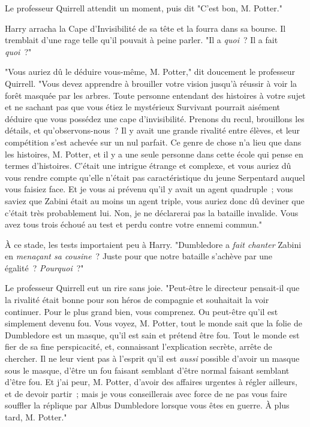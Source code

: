 \later

Le professeur Quirrell attendit un moment, puis dit "C'est bon, M. Potter."

Harry arracha la Cape d'Invisibilité de sa tête et la fourra dans sa bourse. Il tremblait d'une rage telle qu'il pouvait à peine parler. "Il a \emph{quoi}~? Il a fait \emph{quoi}~?"

"Vous auriez dû le déduire vous-même, M. Potter," dit doucement le professeur Quirrell. "Vous devez apprendre à brouiller votre vision jusqu'à réussir à voir la forêt masquée par les arbres. Toute personne entendant des histoires à votre sujet et ne sachant pas que vous étiez le mystérieux Survivant pourrait aisément déduire que vous possédez une cape d'invisibilité. Prenons du recul, brouillons les détails, et qu'observons-nous~? Il y avait une grande rivalité entre élèves, et leur compétition s'est achevée sur un nul parfait. Ce genre de chose n'a lieu que dans les histoires, M. Potter, et il y a une seule personne dans cette école qui pense en termes d'histoires. C'était une intrigue étrange et complexe, et vous auriez dû vous rendre compte qu'elle n'était pas caractéristique du jeune Serpentard auquel vous faisiez face. Et je vous ai prévenu qu'il y avait un agent quadruple~; vous saviez que Zabini était au moins un agent triple, vous auriez donc dû deviner que c'était très probablement lui. Non, je ne déclarerai pas la bataille invalide. Vous avez tous trois échoué au test et perdu contre votre ennemi commun."

À ce stade, les tests importaient peu à Harry. "Dumbledore a \emph{fait chanter} Zabini en \emph{menaçant sa cousine}~? Juste pour que notre bataille s'achève par une égalité~? \emph{Pourquoi}~?"

Le professeur Quirrell eut un rire sans joie. "Peut-être le directeur pensait-il que la rivalité était bonne pour son héros de compagnie et souhaitait la voir continuer. Pour le plus grand bien, vous comprenez. Ou peut-être qu'il est simplement devenu fou. Vous voyez, M. Potter, tout le monde sait que la folie de Dumbledore est un masque, qu'il est sain et prétend être fou. Tout le monde est fier de sa fine perspicacité, et, connaissant l'explication secrète, arrête de chercher. Il ne leur vient pas à l'esprit qu'il est \emph{aussi} possible d'avoir un masque sous le masque, d'être un fou faisant semblant d'être normal faisant semblant d'être fou. Et j'ai peur, M. Potter, d'avoir des affaires urgentes à régler ailleurs, et de devoir partir~; mais je vous conseillerais avec force de ne pas vous faire souffler la réplique par Albus Dumbledore lorsque vous êtes en guerre. À plus tard, M. Potter."


